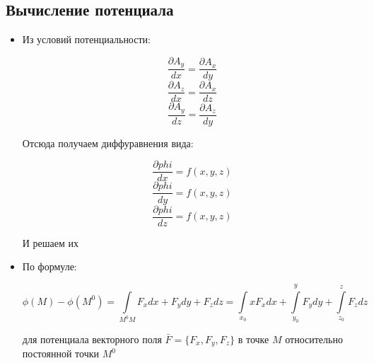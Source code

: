 \subsection{Вычисление потенциала}

\begin{itemize}
\item Из условий потенциальности:

$$\frac{\partial A_y}{dx} = \frac{\partial A_x}{dy}$$
$$\frac{\partial A_z}{dx} = \frac{\partial A_x}{dz}$$
$$\frac{\partial A_y}{dz} = \frac{\partial A_z}{dy}$$

Отсюда получаем диффуравнения вида:

$$\frac{\partial phi}{dx} = f(x,y,z)$$
$$\frac{\partial phi}{dy} = f(x,y,z)$$
$$\frac{\partial phi}{dz} = f(x,y,z)$$

И решаем их

\item По формуле:

$$\phi(M)-\phi(M^0) = \int\limits_{M^0M}F_xdx + F_ydy + F_zdz = \int\limits_{x_0}x F_xdx+ \int\limits_{y_0}^y F_ydy+  \int\limits_{z_0}^z F_zdz$$

для потенциала векторного поля $\bar F = \{F_x, F_y, F_z\}$ в точке $M$ относительно постоянной точки $M^0$



\end{itemize}







